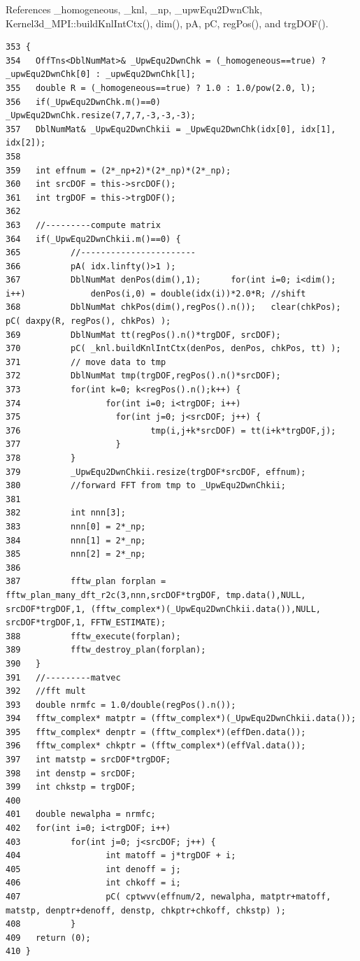 References \_\-homogeneous, \_\-knl, \_\-np, \_\-upw\-Equ2Dwn\-Chk, Kernel3d\_\-MPI::build\-Knl\-Int\-Ctx(), dim(), p\-A, p\-C, reg\-Pos(), and trg\-DOF().

\footnotesize\begin{verbatim}353 {
354   OffTns<DblNumMat>& _UpwEqu2DwnChk = (_homogeneous==true) ? _upwEqu2DwnChk[0] : _upwEqu2DwnChk[l];
355   double R = (_homogeneous==true) ? 1.0 : 1.0/pow(2.0, l); 
356   if(_UpwEqu2DwnChk.m()==0)      _UpwEqu2DwnChk.resize(7,7,7,-3,-3,-3);
357   DblNumMat& _UpwEqu2DwnChkii = _UpwEqu2DwnChk(idx[0], idx[1], idx[2]);
358   
359   int effnum = (2*_np+2)*(2*_np)*(2*_np);
360   int srcDOF = this->srcDOF();
361   int trgDOF = this->trgDOF();
362   
363   //---------compute matrix
364   if(_UpwEqu2DwnChkii.m()==0) { 
365          //-----------------------       
366          pA( idx.linfty()>1 );
367          DblNumMat denPos(dim(),1);      for(int i=0; i<dim(); i++)             denPos(i,0) = double(idx(i))*2.0*R; //shift
368          DblNumMat chkPos(dim(),regPos().n());   clear(chkPos);  pC( daxpy(R, regPos(), chkPos) );
369          DblNumMat tt(regPos().n()*trgDOF, srcDOF);
370          pC( _knl.buildKnlIntCtx(denPos, denPos, chkPos, tt) );
371          // move data to tmp
372          DblNumMat tmp(trgDOF,regPos().n()*srcDOF);
373          for(int k=0; k<regPos().n();k++) {
374                 for(int i=0; i<trgDOF; i++)
375                   for(int j=0; j<srcDOF; j++) {
376                          tmp(i,j+k*srcDOF) = tt(i+k*trgDOF,j);
377                   }
378          }
379          _UpwEqu2DwnChkii.resize(trgDOF*srcDOF, effnum); 
380          //forward FFT from tmp to _UpwEqu2DwnChkii;
381          
382          int nnn[3];
383          nnn[0] = 2*_np;
384          nnn[1] = 2*_np;
385          nnn[2] = 2*_np;
386 
387          fftw_plan forplan = fftw_plan_many_dft_r2c(3,nnn,srcDOF*trgDOF, tmp.data(),NULL, srcDOF*trgDOF,1, (fftw_complex*)(_UpwEqu2DwnChkii.data()),NULL, srcDOF*trgDOF,1, FFTW_ESTIMATE);
388          fftw_execute(forplan);
389          fftw_destroy_plan(forplan);     
390   }
391   //---------matvec
392   //fft mult
393   double nrmfc = 1.0/double(regPos().n());
394   fftw_complex* matptr = (fftw_complex*)(_UpwEqu2DwnChkii.data());
395   fftw_complex* denptr = (fftw_complex*)(effDen.data());
396   fftw_complex* chkptr = (fftw_complex*)(effVal.data());
397   int matstp = srcDOF*trgDOF;
398   int denstp = srcDOF;
399   int chkstp = trgDOF;
400   
401   double newalpha = nrmfc;
402   for(int i=0; i<trgDOF; i++)
403          for(int j=0; j<srcDOF; j++) {
404                 int matoff = j*trgDOF + i;
405                 int denoff = j;
406                 int chkoff = i;
407                 pC( cptwvv(effnum/2, newalpha, matptr+matoff, matstp, denptr+denoff, denstp, chkptr+chkoff, chkstp) );
408          }
409   return (0);
410 }
\end{verbatim}\normalsize 


